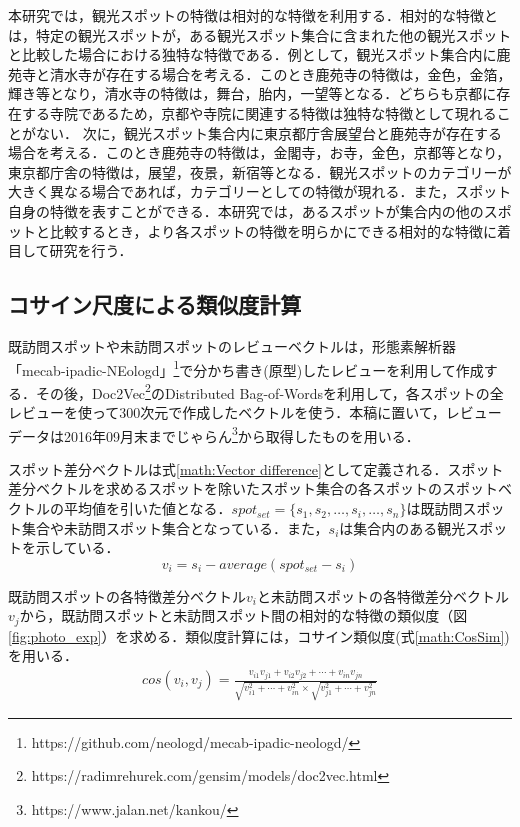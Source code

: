 \documentclass{deimj}
\begin{document}
本研究では，観光スポットの特徴は相対的な特徴を利用する．相対的な特徴とは，特定の観光スポットが，ある観光スポット集合に含まれた他の観光スポットと比較した場合における独特な特徴である．例として，観光スポット集合内に鹿苑寺と清水寺が存在する場合を考える．このとき鹿苑寺の特徴は，金色，金箔，輝き等となり，清水寺の特徴は，舞台，胎内，一望等となる．どちらも京都に存在する寺院であるため，京都や寺院に関連する特徴は独特な特徴として現れることがない．
次に，観光スポット集合内に東京都庁舎展望台と鹿苑寺が存在する場合を考える．このとき鹿苑寺の特徴は，金閣寺，お寺，金色，京都等となり，東京都庁舎の特徴は，展望，夜景，新宿等となる．観光スポットのカテゴリーが大きく異なる場合であれば，カテゴリーとしての特徴が現れる．また，スポット自身の特徴を表すことができる．本研究では，あるスポットが集合内の他のスポットと比較するとき，より各スポットの特徴を明らかにできる相対的な特徴に着目して研究を行う．

\subsection{コサイン尺度による類似度計算}
\label{subsec:Calculation of similarity by cosine similarity}
既訪問スポットや未訪問スポットのレビューベクトルは，形態素解析器「mecab-ipadic-NEologd」\footnote{https://github.com/neologd/mecab-ipadic-neologd/}で分かち書き(原型)したレビューを利用して作成する．その後，Doc2Vec\footnote{https://radimrehurek.com/gensim/models/doc2vec.html}のDistributed Bag-of-Wordsを利用して，各スポットの全レビューを使って300次元で作成したベクトルを使う．本稿に置いて，レビューデータは2016年09月末までじゃらん\footnote{https://www.jalan.net/kankou/}から取得したものを用いる．

スポット差分ベクトルは式\ref{math:Vector difference}として定義される．スポット差分ベクトルを求めるスポットを除いたスポット集合の各スポットのスポットベクトルの平均値を引いた値となる．$spot_{set} =\{s_1,s_2,\dots,s_i,\dots,s_n\}$は既訪問スポット集合や未訪問スポット集合となっている．また，$s_i$は集合内のある観光スポットを示している．
\begin{equation}
  v_i=s_i-average(spot_{set}-s_i)
    \label{math:Vector difference}
\end{equation}

既訪問スポットの各特徴差分ベクトル$v_i$と未訪問スポットの各特徴差分ベクトル$v_j$から，既訪問スポットと未訪問スポット間の相対的な特徴の類似度（図\ref{fig:photo_exp}）を求める．類似度計算には，コサイン類似度(式\ref{math:CosSim})を用いる．
\begin{eqnarray}
cos(v_i,v_j)=\frac{v_{i1}v_{j1}+v_{i2}v_{j2}+\cdots+v_{in}v_{jn}}
{\sqrt{v^2_{i1}+\cdots+v^2_{in}}\times\sqrt{v^2_{j1}+\cdots+v^2_{jn}}}
\label{math:CosSim}
\end{eqnarray}
\end{document}
